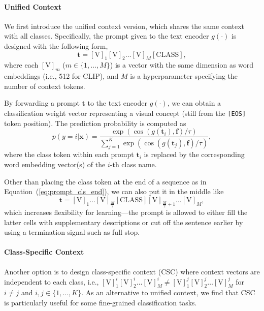 \paragraph{Unified Context}
We first introduce the unified context version, which shares the same context with all classes. Specifically, the prompt given to the text encoder $g(\cdot)$ is designed with the following form,
\begin{equation} \label{eq:prompt_cls_end}
\bm{t} = [\text{V}]_1 [\text{V}]_2 \hdots [\text{V}]_M [\text{CLASS}],
\end{equation}
where each $[\text{V}]_m$ ($m\!\in\!\{1, \hdots, M\}$) is a vector with the same dimension as word embeddings (i.e., 512 for CLIP), and $M$ is a hyperparameter specifying the number of context tokens.

By forwarding a prompt $\bm{t}$ to the text encoder $g(\cdot)$, we can obtain a classification weight vector representing a visual concept (still from the \texttt{[EOS]} token position). The prediction probability is computed as
\begin{equation} \label{eq:prob_coop}
p(y=i|\bm{x}) = \frac{\exp( \cos(g(\bm{t}_i), \bm{f}) /\tau)}{\sum_{j=1}^K \exp( \cos(g(\bm{t}_j), \bm{f}) /\tau)},
\end{equation}
where the class token within each prompt $\bm{t}_i$ is replaced by the corresponding word embedding vector(s) of the $i$-th class name.

Other than placing the class token at the end of a sequence as in Equation~(\ref{eq:prompt_cls_end}), we can also put it in the middle like
\begin{equation} \label{eq:prompt_cls_mid}
\bm{t} = [\text{V}]_1 \hdots [\text{V}]_{\frac{M}{2}} [\text{CLASS}] [\text{V}]_{\frac{M}{2}+1} \hdots [\text{V}]_M,
\end{equation}
which increases flexibility for learning---the prompt is allowed to either fill the latter cells with supplementary descriptions or cut off the sentence earlier by using a termination signal such as full stop.

\paragraph{Class-Specific Context}
Another option is to design class-specific context (CSC) where context vectors are independent to each class, i.e., $[\text{V}]^i_1 [\text{V}]^i_2 \hdots [\text{V}]^i_M \neq [\text{V}]^j_1 [\text{V}]^j_2 \hdots [\text{V}]^j_M$ for $i\!\neq\!j$ and $i, j \in \{1, \hdots, K\}$. As an alternative to unified context, we find that CSC is particularly useful for some fine-grained classification tasks.

